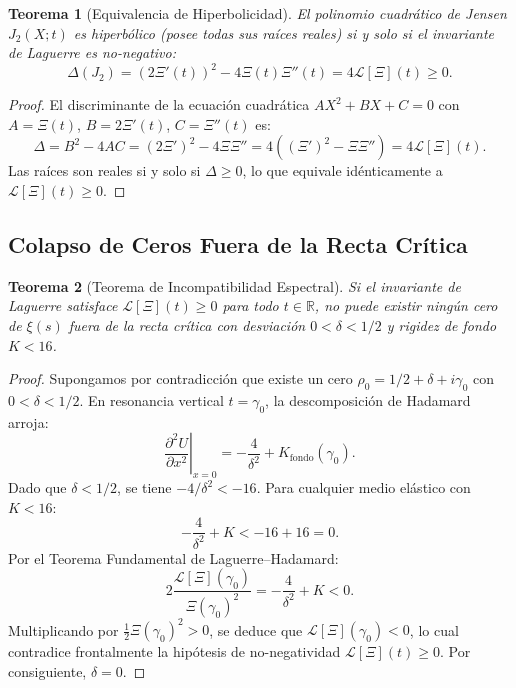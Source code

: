 \documentclass[11pt,a4paper]{article}
\newtheorem{theorem}{Teorema}[section]
\theoremstyle{definition}
\theoremstyle{remark}
\begin{document}
\begin{theorem}[Equivalencia de Hiperbolicidad]
El polinomio cuadrático de Jensen $J_2(X; t)$ es hiperbólico (posee todas sus raíces reales) si y solo si el invariante de Laguerre es no-negativo:
\begin{equation}
\Delta(J_2) = (2\Xi'(t))^2 - 4\Xi(t)\Xi''(t) = 4 \mathcal{L}[\Xi](t) \ge 0.
\end{equation}
\end{theorem}

\begin{proof}
El discriminante de la ecuación cuadrática $A X^2 + B X + C = 0$ con $A = \Xi(t)$, $B = 2\Xi'(t)$, $C = \Xi''(t)$ es:
\begin{equation}
\Delta = B^2 - 4AC = (2\Xi')^2 - 4\Xi\Xi'' = 4((\Xi')^2 - \Xi\Xi'') = 4\mathcal{L}[\Xi](t).
\end{equation}
Las raíces son reales si y solo si $\Delta \ge 0$, lo que equivale idénticamente a $\mathcal{L}[\Xi](t) \ge 0$.
\end{proof}

\subsection{Colapso de Ceros Fuera de la Recta Crítica}

\begin{theorem}[Teorema de Incompatibilidad Espectral]
Si el invariante de Laguerre satisface $\mathcal{L}[\Xi](t) \ge 0$ para todo $t \in \mathbb{R}$, no puede existir ningún cero de $\xi(s)$ fuera de la recta crítica con desviación $0 < \delta < 1/2$ y rigidez de fondo $K < 16$.
\end{theorem}

\begin{proof}
Supongamos por contradicción que existe un cero $\rho_0 = 1/2 + \delta + i\gamma_0$ con $0 < \delta < 1/2$. En resonancia vertical $t = \gamma_0$, la descomposición de Hadamard arroja:
\begin{equation}
\left.\frac{\partial^2 U}{\partial x^2}\right|_{x=0} = -\frac{4}{\delta^2} + K_{\text{fondo}}(\gamma_0).
\end{equation}
Dado que $\delta < 1/2$, se tiene $-4/\delta^2 < -16$. Para cualquier medio elástico con $K < 16$:
\begin{equation}
-\frac{4}{\delta^2} + K < -16 + 16 = 0.
\end{equation}
Por el Teorema Fundamental de Laguerre--Hadamard:
\begin{equation}
2 \frac{\mathcal{L}[\Xi](\gamma_0)}{\Xi(\gamma_0)^2} = -\frac{4}{\delta^2} + K < 0.
\end{equation}
Multiplicando por $\frac{1}{2}\Xi(\gamma_0)^2 > 0$, se deduce que $\mathcal{L}[\Xi](\gamma_0) < 0$, lo cual contradice frontalmente la hipótesis de no-negatividad $\mathcal{L}[\Xi](t) \ge 0$. Por consiguiente, $\delta = 0$.
\end{proof}
\end{document}
